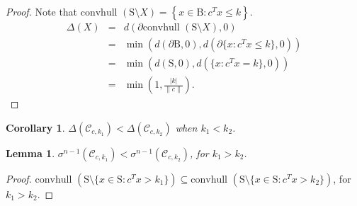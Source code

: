 \documentclass[letterpaper, 10 pt, conference]{ieeeconf}  %
\newcommand{\convhull}{\mbox{convhull } }
\newcommand{\conv}{\convhull }
\newcommand{\dist}{d}
\newcommand{\calC}{\mathcal{C}}
\newcommand{\sphere}{\text{S}}
\newcommand{\ball}{\text{B}}
\newcommand{\calP}{\mathcal{P}}
\newtheorem{lemma}[theorem]{Lemma}
\newtheorem{corollary}[theorem]{Corollary}
\begin{document}
\begin{proof}
Note that $\conv(\sphere \setminus X)= \left\{x \in \ball : c^Tx \leq k \right\}$.
\begin{eqnarray}
\nonumber \Delta(X) &=& \dist(\partial \conv(\sphere \setminus X), 0) \\
\nonumber &=& \min(\dist(\partial \ball, 0), \dist(\partial\{x : c^Tx \leq k\}, 0)) \\
\nonumber &=& \min(\dist(\sphere, 0), \dist(\{x : c^Tx = k\}, 0)) \\
\nonumber &=& \min\left(1, \frac{|k|}{\|c\|}\right).
\end{eqnarray}
\end{proof}
%

\begin{corollary}\label{lemma:deltaMonotone}$\Delta(\calC_{c,k_1}) < \Delta(\calC_{c,k_2})$ when $k_1 < k_2$.
\end{corollary}

\begin{lemma}\label{lemma:muMonotone}$\sigma^{n-1}(\calC_{c,k_1}) < \sigma^{n-1}(\calC_{c,k_2})$, for $k_1 > k_2$.
\end{lemma}

\begin{proof}$\conv(\sphere \setminus \{x\in \sphere: c^Tx >k_1\}) \subseteq \conv(\sphere \setminus \{x\in \sphere: c^Tx >k_2\})$, for $k_1 > k_2$.
\end{proof}
\end{document}
